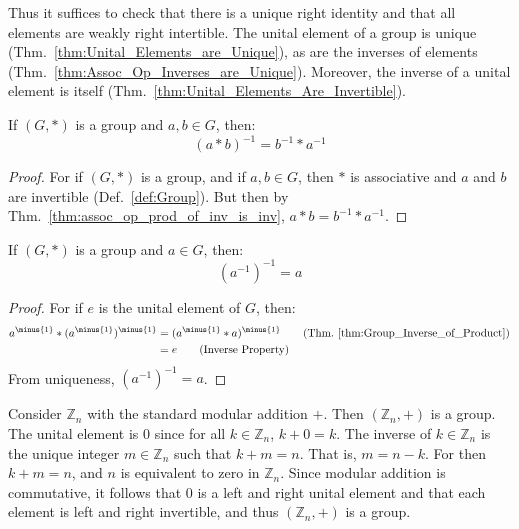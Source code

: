     Thus it suffices to check that there is a unique right identity and that all
    elements are weakly right intertible. The unital element of a group is
    unique (Thm.~\ref{thm:Unital_Elements_are_Unique}), as are the inverses of
    elements (Thm.~\ref{thm:Assoc_Op_Inverses_are_Unique}). Moreover, the
    inverse of a unital element is itself
    (Thm.~\ref{thm:Unital_Elements_Are_Invertible}).
    \begin{theorem}
        \label{thm:Group_Inverse_of_Product}%
        If $(G,*)$ is a group and $a,b\in G$, then:
        \begin{equation}
            (a*b)^{\minus{1}}=b^{\minus{1}}*a^{\minus{1}}
        \end{equation}
    \end{theorem}
    \begin{proof}
        For if $(G,*)$ is a group, and if $a,b\in{G}$, then $*$ is associative
        and $a$ and $b$ are invertible (Def.~\ref{def:Group}). But then by
        Thm.~\ref{thm:assoc_op_prod_of_inv_is_inv},
        $a*b=b^{\minus{1}}*a^{\minus{1}}$.
    \end{proof}
    \begin{theorem}
        If $(G,*)$ is a group and $a\in{G}$, then:
        \begin{equation}
            (a^{\minus{1}})^{\minus{1}}=a
        \end{equation}
    \end{theorem}
    \begin{proof}
        For if $e$ is the unital element of $G$, then:
        \begin{align}
            a^{\minus{1}}*(a^{\minus{1}})^{\minus{1}}
            &=(a^{\minus{1}}* a)^{\minus{1}}
            \tag{Thm.~\ref{thm:Group_Inverse_of_Product}}\\
            &=e
            \tag{Inverse Property}
        \end{align}
        From uniqueness, $(a^{\minus{1}})^{\minus{1}}=a$.
    \end{proof}
    \begin{example}
        Consider $\mathbb{Z}_{n}$ with the standard modular addition $+$. Then
        $(\mathbb{Z}_{n},+)$ is a group. The unital element is $0$ since for all
        $k\in\mathbb{Z}_{n}$, $k+0=k$. The inverse of $k\in\mathbb{Z}_{n}$ is
        the unique integer $m\in\mathbb{Z}_{n}$ such that $k+m=n$. That is,
        $m=n-k$. For then $k+m=n$, and $n$ is equivalent to zero in
        $\mathbb{Z}_{n}$. Since modular addition is commutative, it follows that
        $0$ is a left and right unital element and that each element is left and
        right invertible, and thus $(\mathbb{Z}_{n},+)$ is a group.
    \end{example}
